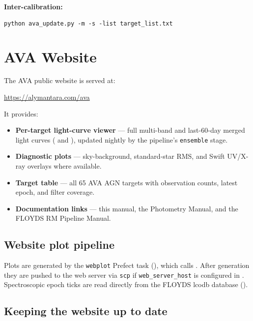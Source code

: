 \documentclass[12pt,a4paper]{article}
\begin{document}
\textbf{Inter-calibration:}
\begin{lstlisting}[style=shell]
python ava_update.py -m -s -list target_list.txt
\end{lstlisting}


\section{AVA Website}
\label{sec:website}

The AVA public website is served at:
\begin{center}
  \url{https://alymantara.com/ava}
\end{center}

It provides:
\begin{itemize}
  \item \textbf{Per-target light-curve viewer} --- full multi-band and last-60-day
        merged light curves ( and
        ), updated nightly by the
        pipeline's \texttt{ensemble} stage.
  \item \textbf{Diagnostic plots} --- sky-background, standard-star RMS,
        and Swift UV/X-ray overlays where available.
  \item \textbf{Target table} --- all 65 AVA AGN targets with observation
        counts, latest epoch, and filter coverage.
  \item \textbf{Documentation links} --- this manual, the Photometry Manual, and
        the FLOYDS RM Pipeline Manual.
\end{itemize}

\subsection{Website plot pipeline}

Plots are generated by the \texttt{webplot} Prefect task
(), which calls
.  After generation they are pushed to the web
server via \texttt{scp} if \texttt{web\_server\_host} is configured in
.  Spectroscopic epoch ticks are read directly
from the FLOYDS lcodb database ().

\subsection{Keeping the website up to date}
\end{document}

